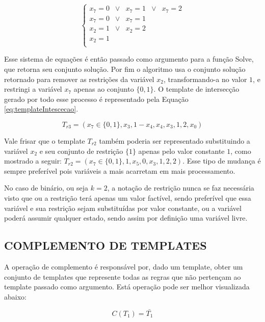 \documentclass[12pt,a4paper]{article}
\begin{document}
	\begin{equation}
	\left\{\begin{matrix}
	x_7	  = 0 	& \vee &	x_7	=	1 & \vee &	x_7	= 2	\\ 
	x_7   = 0 	& \vee &	x_7	=	1					\\ 
	x_2   = 1 	& \vee &	x_2	=	2					\\ 
	x_2	  =	1											\\ 
	\end{matrix}\right.
	\label{eq:interseccaoRestrita}
	\end{equation}

	Esse sistema de equações é então passado como argumento para a função Solve, que retorna seu conjunto solução. Por fim o algoritmo usa o conjunto solução retornado para remover as restrições da variável $x_2$, transformando-a no valor $1$, e restringi a variável $x_7$ apenas ao conjunto $\{0,1\}$. O template de intersecção gerado por todo esse processo é representado pela Equação \ref{eq:templateIntescecao}.

	\begin{equation}
	T_{r3} = (x_7 \in \{0,1\}, x_3, 1-x_4, x_4, x_3, 1, 2, x_0)
	\label{eq:templateIntescecao}
	\end{equation}

	Vale frisar que o template $T_{r2}$ também poderia ser representado substituindo a variável $x_2$ e seu conjunto de restrição $\{1\}$ apenas pelo valor constante $1$, como mostrado a seguir: $T_{r2} = (x_7 \in \{0,1\}, 1, x_5, 0, x_3, 1, 2, 2)$. Esse tipo de mudança é sempre preferível pois variáveis a mais acarretam em mais processamento.

	No caso de binário, ou seja $k = 2$, a notação de restrição nunca se faz necessária visto que ou a restrição terá apenas um valor factível, sendo preferível que essa variável e sua restrição sejam substituídas por valor constante, ou a variável poderá assumir qualquer estado, sendo assim por definição uma variável livre.

\newpage
\subsection{COMPLEMENTO DE TEMPLATES}
	A operação de complemento é responsável por, dado um template, obter um conjunto de templates que represente todas as regras que não pertençam ao template passado como argumento. Está operação pode ser melhor visualizada abaixo:

	\begin{equation}
	C(T_1)=\bar{T_1}
	\end{equation}
\end{document}
